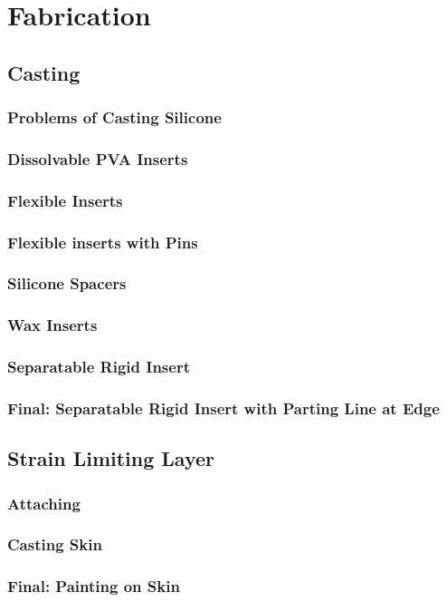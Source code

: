 \chapter{Fabrication}
\section{Casting}
\subsection{Problems of Casting Silicone}
\subsection{Dissolvable PVA Inserts}
\subsection{Flexible Inserts}
\subsection{Flexible inserts with Pins}
\subsection{Silicone Spacers}
\subsection{Wax Inserts}
\subsection{Separatable Rigid Insert}
\subsection{Final: Separatable Rigid Insert with Parting Line at Edge}

\section{Strain Limiting Layer}
\subsection{Attaching}
\subsection{Casting Skin}
\subsection{Final: Painting on Skin}

